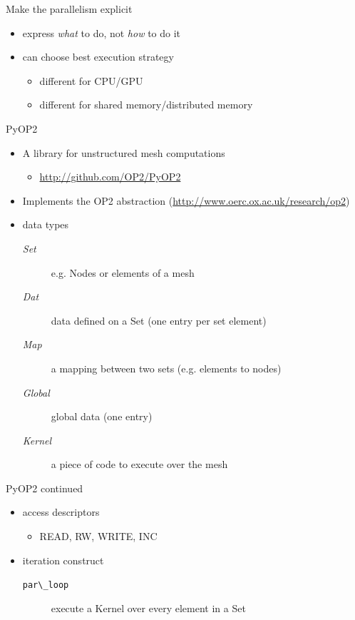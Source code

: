\documentclass[bigger]{beamer}
\begin{document}
\begin{frame}[label={sec:orgheadline5}]{Make the parallelism explicit}
\begin{itemize}
\item express \emph{what} to do, not \emph{how} to do it
\item can choose best execution strategy
\begin{itemize}
\item different for CPU/GPU
\item different for shared memory/distributed memory
\end{itemize}
\end{itemize}
\end{frame}

\begin{frame}[label={sec:orgheadline6}]{PyOP2}
\begin{itemize}
\item A library for unstructured mesh computations
\begin{itemize}
\item \url{http://github.com/OP2/PyOP2}
\end{itemize}
\item Implements the OP2 abstraction (\url{http://www.oerc.ox.ac.uk/research/op2})
\item data types
\begin{description}
\item[{\emph{Set}}] e.g. Nodes or elements of a mesh
\item[{\emph{Dat}}] data defined on a Set (one entry per set element)
\item[{\emph{Map}}] a mapping between two sets (e.g. elements to nodes)
\item[{\emph{Global}}] global data (one entry)
\item[{\emph{Kernel}}] a piece of code to execute over the mesh
\end{description}
\end{itemize}
\end{frame}

\begin{frame}[label={sec:orgheadline7}]{PyOP2 continued}
\begin{itemize}
\item access descriptors
\begin{itemize}
\item READ, RW, WRITE, INC
\end{itemize}
\item iteration construct
\begin{description}
\item[\verb~par\_loop~] execute a Kernel over every element in a Set
\end{description}
\end{itemize}
\end{frame}
\end{document}

